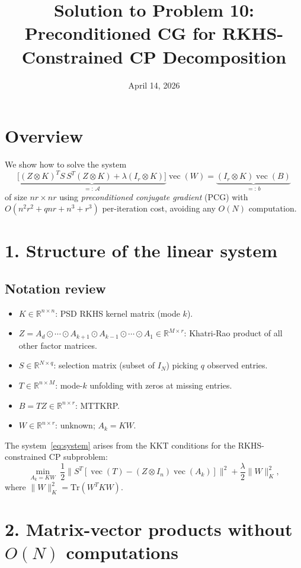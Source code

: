 \documentclass[12pt]{article}
\title{Solution to Problem 10:\\Preconditioned CG for RKHS-Constrained CP Decomposition}
\author{}
\date{April 14, 2026}
\newcommand{\bR}{\mathbb{R}}
\DeclareMathOperator{\vecop}{vec}
\newcommand{\bR}{\mathbb{R}}
\begin{document}
\maketitle

\section*{Overview}

We show how to solve the system
\begin{equation}
  \label{eq:system}
  \underbrace{\bigl[(Z\otimes K)^T S\,S^T(Z\otimes K) + \lambda(I_r\otimes K)\bigr]}_{=:\,\mathcal{A}}\vecop(W)
  = \underbrace{(I_r\otimes K)\vecop(B)}_{=:\,b}
\end{equation}
of size $nr\times nr$ using \emph{preconditioned conjugate gradient} (PCG) with $O(n^2r^2 + qnr + n^3 + r^3)$ per-iteration cost, avoiding any $O(N)$ computation.

\section*{1. Structure of the linear system}

\subsection*{Notation review}
\begin{itemize}
  \item $K\in\bR^{n\times n}$: PSD RKHS kernel matrix (mode $k$).
  \item $Z = A_d\odot\cdots\odot A_{k+1}\odot A_{k-1}\odot\cdots\odot A_1 \in\bR^{M\times r}$: Khatri-Rao product of all other factor matrices.
  \item $S\in\bR^{N\times q}$: selection matrix (subset of $I_N$) picking $q$ observed entries.
  \item $T\in\bR^{n\times M}$: mode-$k$ unfolding with zeros at missing entries.
  \item $B = TZ \in\bR^{n\times r}$: MTTKRP.
  \item $W\in\bR^{n\times r}$: unknown; $A_k = KW$.
\end{itemize}

The system~\eqref{eq:system} arises from the KKT conditions for the RKHS-constrained CP subproblem:
\[
  \min_{A_k = KW}\;\frac12\|S^T[\vecop(T) - (Z\otimes I_n)\vecop(A_k)]\|^2 + \frac\lambda2\|W\|^2_K,
\]
where $\|W\|_K^2 = \mathrm{Tr}(W^T K W)$.

\section*{2. Matrix-vector products without $O(N)$ computations}
\end{document}

